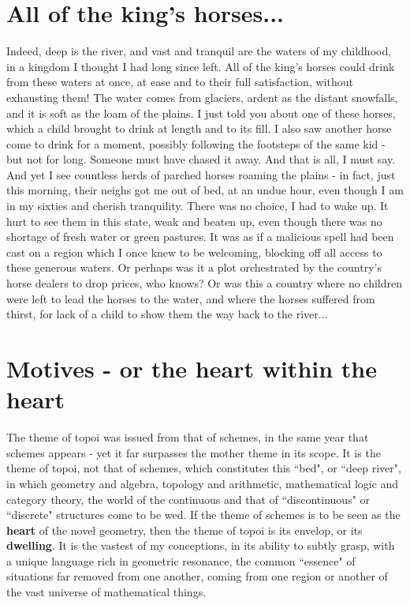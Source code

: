 \section{All of the king's horses...}

Indeed, deep is the river, and vast and tranquil are the waters of my childhood, in a kingdom I thought I had long since left. All of the king's horses could drink from these waters at once, at ease and to their full satisfaction, without exhausting them! The water comes from glaciers, ardent as the distant snowfalls, and it is soft as the loam of the plains. I just told you about one of these horses, which a child brought to drink at length and to its fill. I also saw another horse come to drink for a moment, possibly following the footsteps of the same kid - but not for long. Someone must have chased it away. And that is all, I must say. And yet I see countless herds of parched horses roaming the plains - in fact, just this morning, their neighs got me out of bed, at an undue hour, even though I am in my sixties and cherish tranquility. There was no choice, I had to wake up. It hurt to see them in this state, weak and beaten up, even though there was no shortage of fresh water or green pastures. It was as if a malicious spell had been cast on a region which I once knew to be welcoming, blocking off all access to these generous waters. Or perhaps was it a plot orchestrated by the country's horse dealers to drop prices, who knows? Or was this a country where no children were left to lead the horses to the water, and where the horses suffered from thirst, for lack of a child to show them the way back to the river...

\section{Motives - or the heart within the heart}

The theme of topoi was issued from that of schemes, in the same year that schemes appears - yet it far surpasses the mother theme in its scope. It is the theme of topoi, not that of schemes, which constitutes this ``bed", or ``deep river", in which geometry and algebra, topology and arithmetic, mathematical logic and category theory, the world of the continuous and that of ``discontinuous" or ``discrete" structures come to be wed. If the theme of schemes is to be seen as the \textbf{heart} of the novel geometry, then the theme of topoi is its envelop, or its \textbf{dwelling}. It is the vastest of my conceptions, in its ability to subtly grasp, with a unique language rich in geometric resonance, the common ``essence" of situations far removed from one another, coming from one region or another of the vast universe of mathematical things. 

